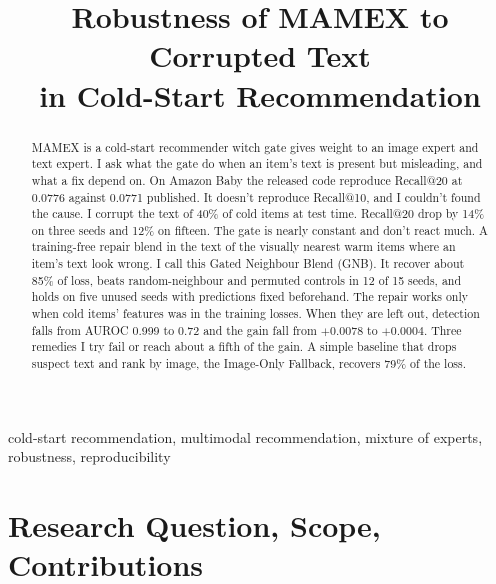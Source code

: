 \documentclass[conference]{IEEEtran}
\begin{document}
\pagestyle{plain}

\title{Robustness of MAMEX to Corrupted Text\\
in Cold-Start Recommendation}

\author{
}

\maketitle
\thispagestyle{plain}

\begin{abstract}
MAMEX is a cold-start recommender witch gate gives weight to an image expert and text expert. I ask what the gate do when an item's text is present but misleading, and what a fix depend on. On Amazon Baby the released code reproduce Recall@20 at 0.0776 against 0.0771 published. It doesn't reproduce Recall@10, and I couldn't found the cause. I corrupt the text of 40\% of cold items at test time. Recall@20 drop by 14\% on three seeds and 12\% on fifteen. The gate is nearly constant and don't react much. A training-free repair blend in the text of the visually nearest warm items where an item's text look wrong. I call this Gated Neighbour Blend (GNB). It recover about 85\% of loss, beats random-neighbour and permuted controls in 12 of 15 seeds, and holds on five unused seeds with predictions fixed beforehand. The repair works only when cold items' features was in the training losses. When they are left out, detection falls from AUROC 0.999 to 0.72 and the gain fall from $+0.0078$ to $+0.0004$. Three remedies I try fail or reach about a fifth of the gain. A simple baseline that drops suspect text and rank by image, the Image-Only Fallback, recovers 79\% of the loss.
\end{abstract}

\begin{IEEEkeywords}
cold-start recommendation, multimodal recommendation, mixture of experts, robustness, reproducibility
\end{IEEEkeywords}

\section{Research Question, Scope, Contributions}
\end{document}
